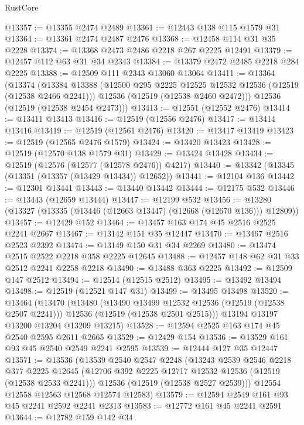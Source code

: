 \begin{lexlean}{RustCore}
\begin{coremodule}
@13357 := @13355 @2474 @2489
@13361 := @12443 @138 @115 @1579 @31
@13364 := @13361 @2474 @2487 @2476
@13368 := @12458 @114 @31 @35 @2228
@13374 := @13368 @2473 @2486 @2218 @267 @2225 @12491
@13379 := @12457 @112 @63 @31 @34 @2343
@13384 := @13379 @2472 @2485 @2218 @284 @2225
@13388 := @12509 @111 @2343 @13060 @13064
@13411 := @13364
    (@13374
      (@13384
        @13388
        (@12500 @295 @2225 @12525 @12532 @12536 (@12519 (@12538 @2466 @2241)))
        @12536
        (@12519 (@12538 @2460 @2472)))
      @12536
      (@12519 (@12538 @2454 @2473)))
@13413 := @12551 (@12552 @2476)
@13414 := @13411 @13413
@13416 := @12519 (@12556 @2476)
@13417 := @13414 @13416
@13419 := @12519 (@12561 @2476)
@13420 := @13417 @13419
@13423 := @12519 (@12565 @2476 @1579)
@13424 := @13420 @13423
@13428 := @12519 (@12570 @138 @1579 @31)
@13429 := @13424 @13428
@13434 := @12519 (@12576 (@12577 (@12578 @2476)) @4217)
@13440 := @13342 (@13345 (@13351 (@13357 (@13429 @13434)) @12652))
@13441 := @12104 @136
@13442 := @12301 @13441
@13443 := @13440 @13442
@13444 := @12175 @532
@13446 := @13443 (@12659 @13444)
@13447 := @12199 @532
@13456 := @13280 (@13327 (@13335 (@13446 (@12663 @13447) (@12668 (@12670 @136))) @12809))
@13457 := @12429 @152
@13464 := @13457 @163 @174 @45 @2516 @2525 @2241 @2667
@13467 := @13142 @151 @35 @12447
@13470 := @13467 @2516 @2523 @2392
@13474 := @13149 @150 @31 @34 @2269
@13480 := @13474 @2515 @2522 @2218 @358 @2225 @12645
@13488 := @12457 @148 @62 @31 @33 @2512 @2241 @2258 @2218
@13490 := @13488 @363 @2225
@13492 := @12509 @147 @2512
@13494 := @12514 (@12515 @2512)
@13495 := @13492 @13494
@13498 := @12519 (@12521 @147 @31)
@13499 := @13495 @13498
@13520 := @13464
    (@13470
      (@13480
        (@13490 @13499 @12532 @12536 (@12519 (@12538 @2507 @2241)))
        @12536
        (@12519 (@12538 @2501 @2515)))
      @13194
      @13197
      @13200
      @13204
      @13209
      @13215)
@13528 := @12594 @2525 @163 @174 @45 @2540 @2595 @2611 @2665
@13529 := @12429 @154
@13536 := @13529 @161 @93 @45 @2540 @2549 @2241 @2595
@13539 := @12444 @127 @35 @12447
@13571 := @13536
    (@13539
      @2540
      @2547
      @2248
      (@13243
        @2539
        @2546
        @2218
        @377
        @2225
        @12645
        (@12706 @392 @2225 @12717 @12532 @12536 (@12519 (@12538 @2533 @2241)))
        @12536
        (@12519 (@12538 @2527 @2539)))
      @12554
      @12558
      @12563
      @12568
      @12574
      @12583)
@13579 := @12594 @2549 @161 @93 @45 @2241 @2592 @2241 @2313
@13583 := @12772 @161 @45 @2241 @2591
@13644 := @12782
    @159
    @142
    @34

\end{coremodule}
\end{lexlean}
